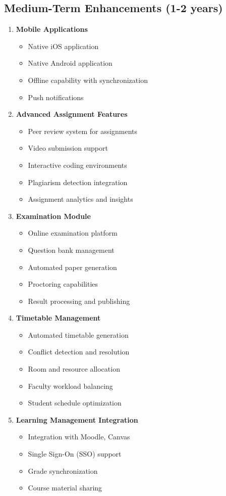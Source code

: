 \subsection{Medium-Term Enhancements (1-2 years)}

\begin{enumerate}
\item \textbf{Mobile Applications}
\begin{itemize}
\item Native iOS application
\item Native Android application
\item Offline capability with synchronization
\item Push notifications
\end{itemize}

\item \textbf{Advanced Assignment Features}
\begin{itemize}
\item Peer review system for assignments
\item Video submission support
\item Interactive coding environments
\item Plagiarism detection integration
\item Assignment analytics and insights
\end{itemize}

\item \textbf{Examination Module}
\begin{itemize}
\item Online examination platform
\item Question bank management
\item Automated paper generation
\item Proctoring capabilities
\item Result processing and publishing
\end{itemize}

\item \textbf{Timetable Management}
\begin{itemize}
\item Automated timetable generation
\item Conflict detection and resolution
\item Room and resource allocation
\item Faculty workload balancing
\item Student schedule optimization
\end{itemize}

\item \textbf{Learning Management Integration}
\begin{itemize}
\item Integration with Moodle, Canvas
\item Single Sign-On (SSO) support
\item Grade synchronization
\item Course material sharing
\end{itemize}
\end{enumerate}

